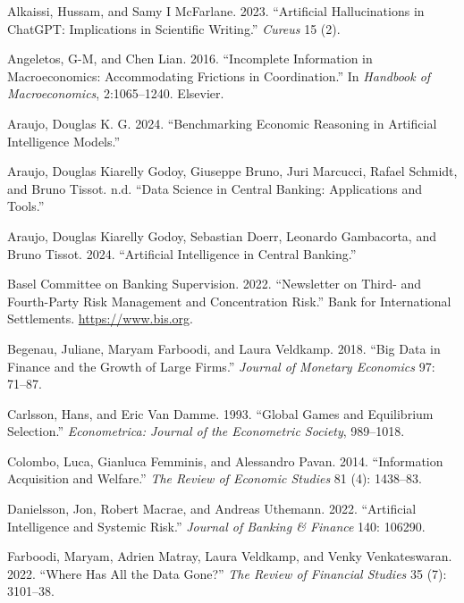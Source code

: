 \documentclass[
]{article}
\newlength{\cslhangindent}
\newenvironment{CSLReferences}[2] %
 {\begin{list}{}{%
  \setlength{\itemindent}{0pt}
  \setlength{\leftmargin}{0pt}
  \setlength{\parsep}{0pt}
  \ifodd #1
   \setlength{\leftmargin}{\cslhangindent}
   \setlength{\itemindent}{-1\cslhangindent}
  \fi
  \setlength{\itemsep}{#2\baselineskip}}}
 {\end{list}}
\theoremstyle{definition}
\theoremstyle{plain}
\theoremstyle{remark}
\begin{document}
\label{refs}
\begin{CSLReferences}{1}{0}
Alkaissi, Hussam, and Samy I McFarlane. 2023. {``Artificial
Hallucinations in ChatGPT: Implications in Scientific Writing.''}
\emph{Cureus} 15 (2).

Angeletos, G-M, and Chen Lian. 2016. {``Incomplete Information in
Macroeconomics: Accommodating Frictions in Coordination.''} In
\emph{Handbook of Macroeconomics}, 2:1065--1240. Elsevier.

Araujo, Douglas K. G. 2024. {``Benchmarking Economic Reasoning in
Artificial Intelligence Models.''}

Araujo, Douglas Kiarelly Godoy, Giuseppe Bruno, Juri Marcucci, Rafael
Schmidt, and Bruno Tissot. n.d. {``Data Science in Central Banking:
Applications and Tools.''}

Araujo, Douglas Kiarelly Godoy, Sebastian Doerr, Leonardo Gambacorta,
and Bruno Tissot. 2024. {``Artificial Intelligence in Central
Banking.''}

Basel Committee on Banking Supervision. 2022. {``{Newsletter on Third-
and Fourth-Party Risk Management and Concentration Risk}.''} {Bank for
International Settlements}. \url{https://www.bis.org}.

Begenau, Juliane, Maryam Farboodi, and Laura Veldkamp. 2018. {``Big Data
in Finance and the Growth of Large Firms.''} \emph{Journal of Monetary
Economics} 97: 71--87.

Carlsson, Hans, and Eric Van Damme. 1993. {``Global Games and
Equilibrium Selection.''} \emph{Econometrica: Journal of the Econometric
Society}, 989--1018.

Colombo, Luca, Gianluca Femminis, and Alessandro Pavan. 2014.
{``Information Acquisition and Welfare.''} \emph{The Review of Economic
Studies} 81 (4): 1438--83.

Danielsson, Jon, Robert Macrae, and Andreas Uthemann. 2022.
{``Artificial Intelligence and Systemic Risk.''} \emph{Journal of
Banking \& Finance} 140: 106290.

Farboodi, Maryam, Adrien Matray, Laura Veldkamp, and Venky
Venkateswaran. 2022. {``Where Has All the Data Gone?''} \emph{The Review
of Financial Studies} 35 (7): 3101--38.


\end{CSLReferences}
\end{document}
